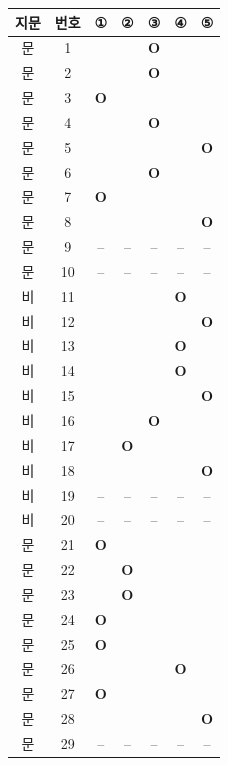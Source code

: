 \documentclass[10pt, a4paper]{article}
\begin{document}
\begin{tabularx}{\textwidth}{|c|c|c|c|c|c|c|}
\hline
\textbf{지문} & \textbf{번호} & ① & ② & ③ & ④ & ⑤ \\
\hline
[1]문 & 1 &  &  & \textbf{O} &  &  \\
\hline
[1]문 & 2 &  &  & \textbf{O} &  &  \\
\hline
[1]문 & 3 & \textbf{O} &  &  &  &  \\
\hline
[1]문 & 4 &  &  & \textbf{O} &  &  \\
\hline
[1]문 & 5 &  &  &  &  & \textbf{O} \\
\hline
[1]문 & 6 &  &  & \textbf{O} &  &  \\
\hline
[1]문 & 7 & \textbf{O} &  &  &  &  \\
\hline
[1]문 & 8 &  &  &  &  & \textbf{O} \\
\hline
[1]문 & 9 & -- & -- & -- & -- & -- \\
\hline
[1]문 & 10 & -- & -- & -- & -- & -- \\
\hline
[2]비 & 11 &  &  &  & \textbf{O} &  \\
\hline
[2]비 & 12 &  &  &  &  & \textbf{O} \\
\hline
[2]비 & 13 &  &  &  & \textbf{O} &  \\
\hline
[2]비 & 14 &  &  &  & \textbf{O} &  \\
\hline
[2]비 & 15 &  &  &  &  & \textbf{O} \\
\hline
[2]비 & 16 &  &  & \textbf{O} &  &  \\
\hline
[2]비 & 17 &  & \textbf{O} &  &  &  \\
\hline
[2]비 & 18 &  &  &  &  & \textbf{O} \\
\hline
[2]비 & 19 & -- & -- & -- & -- & -- \\
\hline
[2]비 & 20 & -- & -- & -- & -- & -- \\
\hline
[3]문 & 21 & \textbf{O} &  &  &  &  \\
\hline
[3]문 & 22 &  & \textbf{O} &  &  &  \\
\hline
[3]문 & 23 &  & \textbf{O} &  &  &  \\
\hline
[3]문 & 24 & \textbf{O} &  &  &  &  \\
\hline
[3]문 & 25 & \textbf{O} &  &  &  &  \\
\hline
[3]문 & 26 &  &  &  & \textbf{O} &  \\
\hline
[3]문 & 27 & \textbf{O} &  &  &  &  \\
\hline
[3]문 & 28 &  &  &  &  & \textbf{O} \\
\hline
[3]문 & 29 & -- & -- & -- & -- & -- \\

\end{tabularx}
\end{document}
